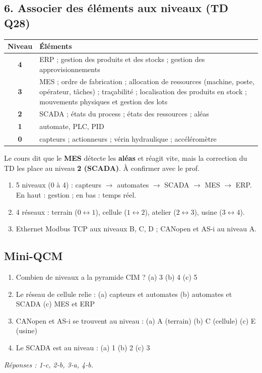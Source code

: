 \documentclass[11pt,a4paper]{article}
\begin{document}
\subsection*{6. Associer des éléments aux niveaux (TD Q28)}
\begin{center}
\begin{tabularx}{\linewidth}{c X}
\toprule
\textbf{Niveau} & \textbf{Éléments} \\
\midrule
\textbf{4} & ERP ; gestion des produits et des stocks ; gestion des approvisionnements \\
\textbf{3} & MES ; ordre de fabrication ; allocation de ressources (machine, poste, opérateur, tâches) ; traçabilité ; localisation des produits en stock ; mouvements physiques et gestion des lots \\
\textbf{2} & SCADA ; états du process ; états des ressources ; aléas \\
\textbf{1} & automate, PLC, PID \\
\textbf{0} & capteurs ; actionneurs ; vérin hydraulique ; accéléromètre \\
\bottomrule
\end{tabularx}
\end{center}
\begin{alerte}
Le cours dit que le \textbf{MES} détecte les \textbf{aléas} et réagit vite, mais la correction du TD les place au niveau \textbf{2 (SCADA)}. À confirmer avec le prof.
\end{alerte}

\begin{resume}
\begin{enumerate}
\item 5 niveaux (0 à 4) : capteurs $\rightarrow$ automates $\rightarrow$ SCADA $\rightarrow$ MES $\rightarrow$ ERP. En haut : gestion ; en bas : temps réel.
\item 4 réseaux : terrain ($0\leftrightarrow1$), cellule ($1\leftrightarrow2$), atelier ($2\leftrightarrow3$), usine ($3\leftrightarrow4$).
\item Ethernet Modbus TCP aux niveaux B, C, D ; CANopen et AS-i au niveau A.
\end{enumerate}
\end{resume}

\subsection*{Mini-QCM}
\begin{enumerate}
\item Combien de niveaux a la pyramide CIM ? (a) 3 (b) 4 (c) 5
\item Le réseau de cellule relie : (a) capteurs et automates (b) automates et SCADA (c) MES et ERP
\item CANopen et AS-i se trouvent au niveau : (a) A (terrain) (b) C (cellule) (c) E (usine)
\item Le SCADA est au niveau : (a) 1 (b) 2 (c) 3
\end{enumerate}
{\small\textit{Réponses : 1-c, 2-b, 3-a, 4-b.}}
\end{document}
